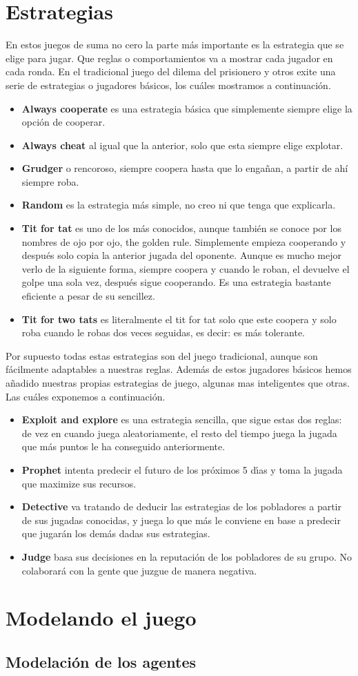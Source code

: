 \documentclass{article}
\begin{document}
\section{Estrategias}
En estos juegos de suma no cero la parte m\'as importante es la estrategia que se elige para jugar. Que reglas o comportamientos va a mostrar cada jugador en cada ronda.
En el tradicional juego del dilema del prisionero y otros exite una serie de estrategias o jugadores b\'asicos, los cu\'ales mostramos a continuaci\'on.
\begin{itemize}
    \item \textbf{Always cooperate} es una estrategia b\'asica que simplemente siempre elige la opci\'on de cooperar.
    \item \textbf{Always cheat} al igual que la anterior, solo que esta siempre elige explotar.
    \item \textbf{Grudger} o rencoroso, siempre coopera hasta que lo enga\~nan, a partir de ah\'i siempre roba.
    \item \textbf{Random} es la estrategia m\'as simple, no creo ni que tenga que explicarla.
    \item \textbf{Tit for tat} es uno de los m\'as conocidos, aunque tambi\'en se conoce por los nombres de ojo por ojo, the golden rule. Simplemente empieza cooperando
          y despu\'es solo copia la anterior jugada del oponente. Aunque es mucho mejor verlo de la siguiente forma, siempre coopera y cuando le roban, el devuelve el
          golpe una sola vez, despu\'es sigue cooperando. Es una estrategia bastante eficiente a pesar de su sencillez.
    \item \textbf{Tit for two tats} es literalmente el tit for tat solo que este coopera y solo roba cuando le robas dos veces seguidas, es decir: es m\'as tolerante.
\end{itemize}
Por supuesto todas estas estrategias son del juego tradicional, aunque son f\'acilmente adaptables a nuestras reglas. Adem\'as de estos jugadores b\'asicos
hemos a\~nadido nuestras propias estrategias de juego, algunas mas inteligentes que otras. Las cu\'ales exponemos a continuaci\'on.
\begin{itemize}
    \item \textbf{Exploit and explore} es una estrategia sencilla, que sigue estas dos reglas: de vez en cuando juega aleatoriamente, el resto del tiempo juega la jugada
          que m\'as puntos le ha conseguido anteriormente.
    \item \textbf{Prophet} intenta predecir el futuro de los pr\'oximos 5 d\'{\i}as y toma la jugada que maximize sus recursos.
    \item \textbf{Detective} va tratando de deducir las estrategias de los pobladores a partir de sus jugadas conocidas, y juega lo que m\'as le conviene en base a predecir
          que jugar\'an los dem\'as dadas sus estrategias.
    \item \textbf{Judge} basa sus decisiones en la reputaci\'on de los pobladores de su grupo. No colaborar\'a con la gente que juzgue de manera negativa.
\end{itemize}
\newpage

\section{Modelando el juego}

\subsection{Modelaci\'on de los agentes}
\end{document}
